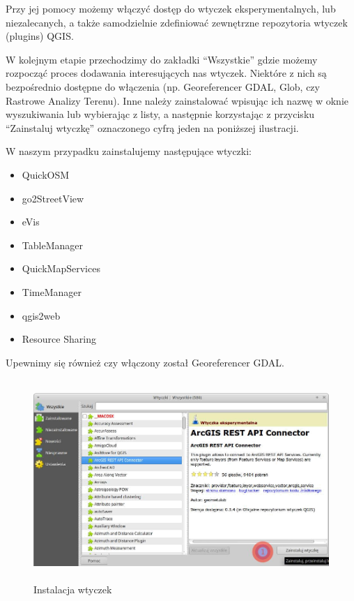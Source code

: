 \documentclass[12pt,a4paper]{book}
\begin{document}
Przy jej pomocy możemy włączyć dostęp do wtyczek eksperymentalnych, lub niezalecanych, a także samodzielnie zdefiniować zewnętrzne repozytoria wtyczek (plugins) QGIS.

W kolejnym etapie przechodzimy do zakładki ``Wszystkie'' gdzie możemy rozpocząć proces dodawania interesujących nas wtyczek. Niektóre z nich są bezpośrednio dostępne do włączenia (np. Georeferencer GDAL, Glob, czy Rastrowe Analizy Terenu). Inne należy zainstalować wpisując ich nazwę w oknie wyszukiwania lub wybierając z listy, a następnie korzystając z przycisku ``Zainstaluj wtyczkę'' oznaczonego cyfrą jeden na poniższej ilustracji.

W naszym przypadku zainstalujemy następujące wtyczki:

\begin{center}
\begin{itemize}
\item QuickOSM
\item go2StreetView
\item eVis
\item TableManager
\item QuickMapServices
\item TimeManager
\item qgis2web
\item Resource Sharing
\end{itemize}
\end{center}
Upewnimy się również czy włączony został Georeferencer GDAL.

\begin{center}
\begin{figure}
\includegraphics[width=13cm,height=7.592cm]{002-wtyczki-instalacja.png}
\caption{Instalacja wtyczek}
\end{figure}
\end{center}
\end{document}
